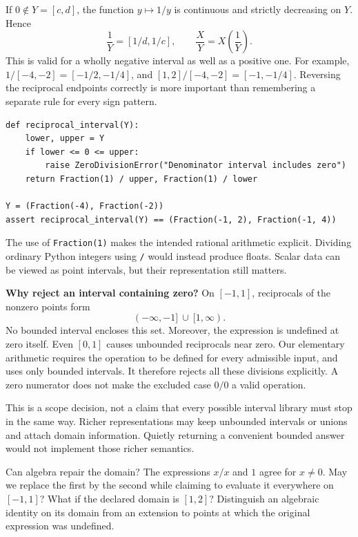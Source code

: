 \newpage
{}
If $0\notin Y=[c,d]$, the function $y\mapsto1/y$ is continuous and strictly
decreasing on $Y$. Hence
\[
 \frac1Y=[1/d,1/c],\qquad \frac XY=X\left(\frac1Y\right).
\]
This is valid for a wholly negative interval as well as a positive one.
For example, $1/[-4,-2]=[-1/2,-1/4]$, and
$[1,2]/[-4,-2]=[-1,-1/4]$. Reversing the reciprocal endpoints correctly is
more important than remembering a separate rule for every sign pattern.
\begin{lstlisting}
def reciprocal_interval(Y):
    lower, upper = Y
    if lower <= 0 <= upper:
        raise ZeroDivisionError("Denominator interval includes zero")
    return Fraction(1) / upper, Fraction(1) / lower

Y = (Fraction(-4), Fraction(-2))
assert reciprocal_interval(Y) == (Fraction(-1, 2), Fraction(-1, 4))
\end{lstlisting}
The use of \texttt{Fraction(1)} makes the intended rational arithmetic explicit.
Dividing ordinary Python integers using \texttt{/} would instead produce floats.
Scalar data can be viewed as point intervals, but their representation still matters.

\textbf{Why reject an interval containing zero?} On $[-1,1]$, reciprocals of
the nonzero points form
\[
 (-\infty,-1]\ \cup\ [1,\infty).
\]
No bounded interval encloses this set. Moreover, the expression is undefined at
zero itself. Even $[0,1]$ causes unbounded reciprocals near zero. Our elementary
arithmetic requires the operation to be defined for every admissible input, and
uses only bounded intervals. It therefore rejects all these divisions explicitly.
A zero numerator does not make the excluded case $0/0$ a valid operation.

This is a scope decision, not a claim that every possible interval library must
stop in the same way. Richer representations may keep unbounded intervals or
unions and attach domain information. Quietly returning a convenient bounded
answer would not implement those richer semantics.

\begin{question}{Can algebra repair the domain?}
The expressions $x/x$ and $1$ agree for $x\ne0$. May we replace the first by the
second while claiming to evaluate it everywhere on $[-1,1]$? What if the declared
domain is $[1,2]$? Distinguish an algebraic identity on its domain from an extension
to points at which the original expression was undefined.
\end{question}

